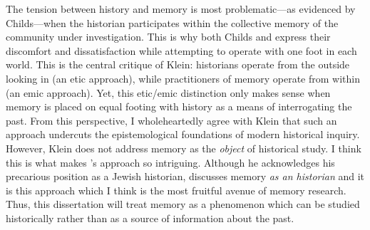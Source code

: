 The tension between history and memory is most problematic---as evidenced by Childs---when the historian participates within the collective memory of the community under investigation. This is why both Childs and \yerushalmi express their discomfort and dissatisfaction while attempting to operate with one foot in each world. This is the central critique of Klein: historians operate from the outside looking in (an etic approach), while practitioners of memory operate from within (an emic approach). Yet, this etic/emic distinction only makes sense when memory is placed on equal footing with history as a means of interrogating the past. From this perspective, I wholeheartedly agree with Klein that such an approach undercuts the epistemological foundations of modern historical inquiry. However, Klein does not address memory as the \emph{object} of historical study. I think this is what makes \yerushalmi's approach so intriguing. Although he acknowledges his precarious position as a Jewish historian, \yerushalmi discusses memory \emph{as an historian} and it is this approach which I think is the most fruitful avenue of memory research. Thus, this dissertation will treat memory as a phenomenon which can be studied historically rather than as a source of information about the past.  